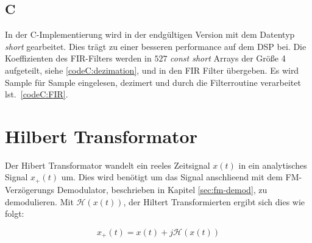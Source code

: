 \documentclass{article}
\begin{document}
\subsection{C}
In der C-Implementierung wird in der endgültigen Version mit dem Datentyp \textit{short} gearbeitet. 
Dies trägt zu einer besseren performance auf dem DSP bei.
Die Koeffizienten des FIR-Filters werden in $527$ \textit{const short} Arrays der Größe 4 aufgeteilt, siehe \ref{codeC:dezimation},
und in den FIR Filter übergeben. Es wird Sample für Sample eingelesen, dezimert und durch die Filterroutine verarbeitet lst.~\ref{codeC:FIR}.


%    
%

\section{Hilbert Transformator}\label{sec:hilbert}
Der Hibert Transformator wandelt ein reeles Zeitsignal $x(t)$ in ein analytisches Signal $x_+(t)$ um.
Dies wird benötigt um das Signal anschlieend mit dem FM-Verzögerungs Demodulator, beschrieben in Kapitel \ref{sec:fm-demod}, zu demodulieren.
Mit $\mathcal{H}(x(t))$, der Hiltert Transformierten ergibt sich dies wie folgt:

$$ 
x_+(t) = x(t) + j \mathcal{H}(x(t))
$$
\end{document}
